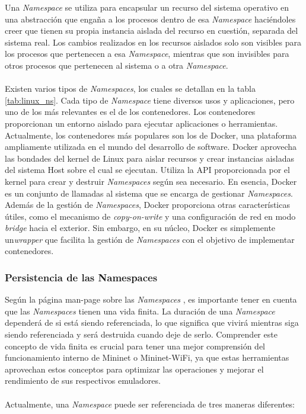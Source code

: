 Una \textit{Namespace} se utiliza para encapsular un recurso del sistema operativo en una abstracción que engaña a los procesos dentro de esa \textit{Namespace} haciéndoles creer que tienen su propia instancia aislada del recurso en cuestión, separada del sistema real. Los cambios realizados en los recursos aislados solo son visibles para los procesos que pertenecen a esa \textit{Namespace}, mientras que son invisibles para otros procesos que pertenecen al sistema o a otra \textit{Namespace}.\\
\\
Existen varios tipos de \textit{Namespaces}, los cuales se detallan en la tabla \ref{tab:linux_ns}. Cada tipo de \textit{Namespace} tiene diversos usos y aplicaciones, pero uno de los más relevantes es el de los contenedores. Los contenedores proporcionan un entorno aislado para ejecutar aplicaciones o herramientas. Actualmente, los contenedores más populares son los de Docker, una plataforma ampliamente utilizada en el mundo del desarrollo de software. Docker aprovecha las bondades del kernel de Linux para aislar recursos y crear instancias aisladas del sistema Host sobre el cual se ejecutan. Utiliza la API proporcionada por el kernel para crear y destruir \textit{Namespaces} según sea necesario. En esencia, Docker es un conjunto de llamadas al sistema que se encarga de gestionar \textit{Namespaces}. Además de la gestión de \textit{Namespaces}, Docker proporciona otras características útiles, como el mecanismo de \textit{copy-on-write} y una configuración de red en modo \textit{bridge} hacia el exterior. Sin embargo, en su núcleo, Docker es simplemente un\textit{wrapper} que facilita la gestión de \textit{Namespaces} con el objetivo de implementar contenedores.



\subsubsection{Persistencia de las Namespaces}


Según la página man-page sobre las \textit{Namespaces} \cite{ns}, es importante tener en cuenta que las \textit{Namespaces} tienen una vida finita. La duración de una \textit{Namespace} dependerá de si está siendo referenciada, lo que significa que vivirá mientras siga siendo referenciada y será destruida cuando deje de serlo. Comprender este concepto de vida finita es crucial para tener una mejor comprensión del funcionamiento interno de Mininet o Mininet-WiFi, ya que estas herramientas aprovechan estos conceptos para optimizar las operaciones y mejorar el rendimiento de sus respectivos emuladores.\\
\\
Actualmente, una \textit{Namespace} puede ser referenciada de tres maneras diferentes:

